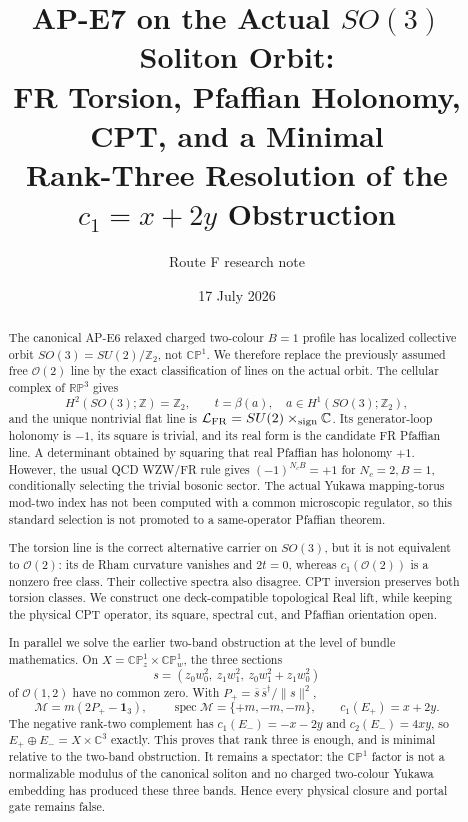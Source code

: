 \documentclass[11pt]{article}
\title{AP-E7 on the Actual \(SO(3)\) Soliton Orbit:\\
FR Torsion, Pfaffian Holonomy, CPT, and a Minimal\\
Rank-Three Resolution of the \(c_1=x+2y\) Obstruction}
\author{Route F research note}
\date{17 July 2026}
\theoremstyle{definition}
\theoremstyle{remark}
\newcommand{\CC}{\mathbb C}
\newcommand{\ZZ}{\mathbb Z}
\newcommand{\CP}{\mathbb {CP}}
\newcommand{\RP}{\mathbb {RP}}
\newcommand{\cO}{\mathcal O}
\newcommand{\cL}{\mathcal L}
\newcommand{\cM}{\mathcal M}
\begin{document}
\maketitle

\begin{abstract}
The canonical AP-E6 relaxed charged two-colour \(B=1\) profile has localized
collective orbit \(SO(3)=SU(2)/\ZZ_2\), not \(\CP^1\).  We therefore replace
the previously assumed free \(\cO(2)\) line by the exact classification of
lines on the actual orbit.  The cellular complex of \(\RP^3\) gives
\[
 H^2(SO(3);\ZZ)=\ZZ_2,\qquad
 t=\beta(a),\quad a\in H^1(SO(3);\ZZ_2),
\]
and the unique nontrivial flat line is
\(\cL_{\rm FR}=SU(2)\mathbin{\times}_{\rm sign}\CC\).  Its generator-loop
holonomy is \(-1\), its square is trivial, and its real form is the candidate
FR Pfaffian line.  A determinant obtained by squaring that real Pfaffian has
holonomy \(+1\).  However, the usual QCD WZW/FR rule gives
\((-1)^{N_cB}=+1\) for \(N_c=2,B=1\), conditionally selecting the trivial
bosonic sector.  The actual Yukawa mapping-torus mod-two index has not been
computed with a common microscopic regulator, so this standard selection is
not promoted to a same-operator Pfaffian theorem.

The torsion line is the correct alternative carrier on \(SO(3)\), but it is
not equivalent to \(\cO(2)\): its de Rham curvature vanishes and \(2t=0\),
whereas \(c_1(\cO(2))\) is a nonzero free class.  Their collective spectra
also disagree.  CPT inversion preserves both torsion classes.  We construct
one deck-compatible topological Real lift, while keeping the physical CPT
operator, its square, spectral cut, and Pfaffian orientation open.

In parallel we solve the earlier two-band obstruction at the level of bundle
mathematics.  On \(X=\CP^1_z\times\CP^1_w\), the three sections
\[
 s=(z_0w_0^2,\ z_1w_1^2,\ z_0w_1^2+z_1w_0^2)
\]
of \(\cO(1,2)\) have no common zero.  With
\(P_+=\overline{s}\,\overline{s}^{\dagger}/\lVert s\rVert^2\),
\[
 \cM=m(2P_+-\bm1_3),\qquad
 \operatorname{spec}\cM=\{+m,-m,-m\},\qquad
 c_1(E_+)=x+2y .
\]
The negative rank-two complement has
\(c_1(E_-)=-x-2y\) and \(c_2(E_-)=4xy\), so
\(E_+\oplus E_-=X\times\CC^3\) exactly.  This proves that rank three is
enough, and is minimal relative to the two-band obstruction.  It remains a
spectator: the \(\CP^1\) factor is not a normalizable modulus of the canonical
soliton and no charged two-colour Yukawa embedding has produced these three
bands.  Hence every physical closure and portal gate remains false.
\end{abstract}
\end{document}
